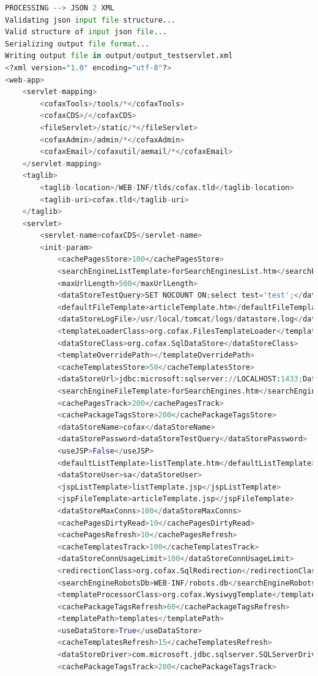 \documentclass[a4paper,11pt]{book}
\begin{document}
\begin{lstlisting}[language=python,caption={make testServlet }]
PROCESSING --> JSON 2 XML 
Validating json input file structure...
Valid structure of input json file...
Serializing output file format...
Writing output file in output/output_testservlet.xml
<?xml version="1.0" encoding="utf-8"?>
<web-app>
	<servlet-mapping>
		<cofaxTools>/tools/*</cofaxTools>
		<cofaxCDS>/</cofaxCDS>
		<fileServlet>/static/*</fileServlet>
		<cofaxAdmin>/admin/*</cofaxAdmin>
		<cofaxEmail>/cofaxutil/aemail/*</cofaxEmail>
	</servlet-mapping>
	<taglib>
		<taglib-location>/WEB-INF/tlds/cofax.tld</taglib-location>
		<taglib-uri>cofax.tld</taglib-uri>
	</taglib>
	<servlet>
		<servlet-name>cofaxCDS</servlet-name>
		<init-param>
			<cachePagesStore>100</cachePagesStore>
			<searchEngineListTemplate>forSearchEnginesList.htm</searchEngineListTemplate>
			<maxUrlLength>500</maxUrlLength>
			<dataStoreTestQuery>SET NOCOUNT ON;select test='test';</dataStoreTestQuery>
			<defaultFileTemplate>articleTemplate.htm</defaultFileTemplate>
			<dataStoreLogFile>/usr/local/tomcat/logs/datastore.log</dataStoreLogFile>
			<templateLoaderClass>org.cofax.FilesTemplateLoader</templateLoaderClass>
			<dataStoreClass>org.cofax.SqlDataStore</dataStoreClass>
			<templateOverridePath></templateOverridePath>
			<cacheTemplatesStore>50</cacheTemplatesStore>
			<dataStoreUrl>jdbc:microsoft:sqlserver://LOCALHOST:1433;DatabaseName=goon</dataStoreUrl>
			<searchEngineFileTemplate>forSearchEngines.htm</searchEngineFileTemplate>
			<cachePagesTrack>200</cachePagesTrack>
			<cachePackageTagsStore>200</cachePackageTagsStore>
			<dataStoreName>cofax</dataStoreName>
			<dataStorePassword>dataStoreTestQuery</dataStorePassword>
			<useJSP>False</useJSP>
			<defaultListTemplate>listTemplate.htm</defaultListTemplate>
			<dataStoreUser>sa</dataStoreUser>
			<jspListTemplate>listTemplate.jsp</jspListTemplate>
			<jspFileTemplate>articleTemplate.jsp</jspFileTemplate>
			<dataStoreMaxConns>100</dataStoreMaxConns>
			<cachePagesDirtyRead>10</cachePagesDirtyRead>
			<cachePagesRefresh>10</cachePagesRefresh>
			<cacheTemplatesTrack>100</cacheTemplatesTrack>
			<dataStoreConnUsageLimit>100</dataStoreConnUsageLimit>
			<redirectionClass>org.cofax.SqlRedirection</redirectionClass>
			<searchEngineRobotsDb>WEB-INF/robots.db</searchEngineRobotsDb>
			<templateProcessorClass>org.cofax.WysiwygTemplate</templateProcessorClass>
			<cachePackageTagsRefresh>60</cachePackageTagsRefresh>
			<templatePath>templates</templatePath>
			<useDataStore>True</useDataStore>
			<cacheTemplatesRefresh>15</cacheTemplatesRefresh>
			<dataStoreDriver>com.microsoft.jdbc.sqlserver.SQLServerDriver</dataStoreDriver>
			<cachePackageTagsTrack>200</cachePackageTagsTrack>

\end{lstlisting}
\end{document}
